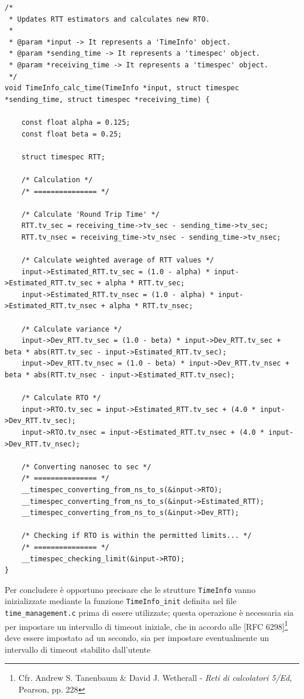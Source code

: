 \documentclass[10pt,a4paper, titlepage]{report}
\begin{document}
\begin{lstlisting}[frame=lines, caption={Implementazione della funzione \texttt{TimeInfo\_calc\_time}}, label={code:time_info_calc}]
/*
 * Updates RTT estimators and calculates new RTO.
 *
 * @param *input -> It represents a 'TimeInfo' object.
 * @param *sending_time -> It represents a 'timespec' object.
 * @param *receiving_time -> It represents a 'timespec' object.
 */
void TimeInfo_calc_time(TimeInfo *input, struct timespec *sending_time, struct timespec *receiving_time) {

	const float alpha = 0.125;
	const float beta = 0.25;

	struct timespec RTT;

	/* Calculation */
	/* =============== */

	/* Calculate 'Round Trip Time' */
	RTT.tv_sec = receiving_time->tv_sec - sending_time->tv_sec;
	RTT.tv_nsec = receiving_time->tv_nsec - sending_time->tv_nsec;

	/* Calculate weighted average of RTT values */
	input->Estimated_RTT.tv_sec = (1.0 - alpha) * input->Estimated_RTT.tv_sec + alpha * RTT.tv_sec;
	input->Estimated_RTT.tv_nsec = (1.0 - alpha) * input->Estimated_RTT.tv_nsec + alpha * RTT.tv_nsec;

	/* Calculate variance */
	input->Dev_RTT.tv_sec = (1.0 - beta) * input->Dev_RTT.tv_sec + beta * abs(RTT.tv_sec - input->Estimated_RTT.tv_sec);
	input->Dev_RTT.tv_nsec = (1.0 - beta) * input->Dev_RTT.tv_nsec + beta * abs(RTT.tv_nsec - input->Estimated_RTT.tv_nsec);

	/* Calculate RTO */
	input->RTO.tv_sec = input->Estimated_RTT.tv_sec + (4.0 * input->Dev_RTT.tv_sec);
	input->RTO.tv_nsec = input->Estimated_RTT.tv_nsec + (4.0 * input->Dev_RTT.tv_nsec);

	/* Converting nanosec to sec */
	/* =============== */
	__timespec_converting_from_ns_to_s(&input->RTO);
	__timespec_converting_from_ns_to_s(&input->Estimated_RTT);
	__timespec_converting_from_ns_to_s(&input->Dev_RTT);

	/* Checking if RTO is within the permitted limits... */
	/* =============== */
	__timespec_checking_limit(&input->RTO);
}
\end{lstlisting}

Per concludere è opportuno precisare che le strutture \texttt{TimeInfo} vanno inizializzate mediante la funzione \texttt{TimeInfo\_init} definita nel file \texttt{time\_management.c} prima di essere utilizzate; questa operazione è necessaria sia per impostare un intervallo di timeout iniziale, che in accordo alle [RFC 6298]\footnote{Cfr. Andrew S. Tanenbaum \& David J. Wetherall - \textit{Reti di calcolatori 5/Ed}, Pearson, pp. 228} deve essere impostato ad un secondo, sia per impostare eventualmente un intervallo di timeout stabilito dall'utente 
\end{document}
